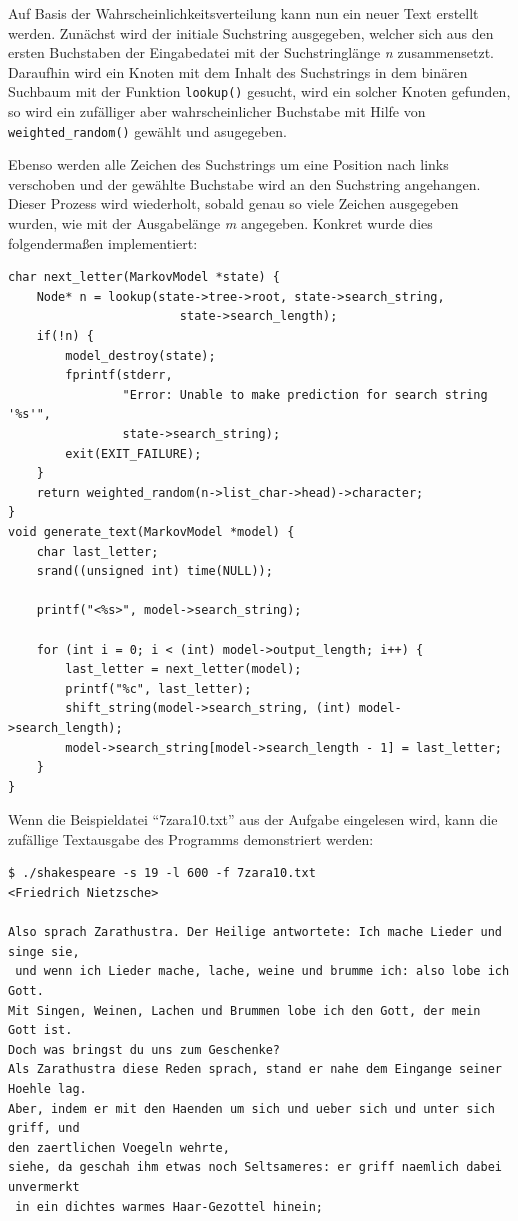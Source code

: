 \documentclass[10pt,a4paper]{article}
\begin{document}
\begin{spacing}{1}
Auf Basis der Wahrscheinlichkeitsverteilung kann nun ein neuer Text erstellt
werden. Zunächst wird der initiale Suchstring ausgegeben, welcher sich aus den
ersten Buchstaben der Eingabedatei mit der Suchstringlänge {\it n\/} zusammensetzt.
Daraufhin wird ein Knoten mit dem Inhalt des Suchstrings in dem binären Suchbaum
mit der Funktion \texttt{lookup()} gesucht,
wird ein solcher Knoten gefunden, so wird ein zufälliger aber wahrscheinlicher Buchstabe
mit Hilfe von \texttt{weighted\_random()} gewählt und asugegeben.

Ebenso werden
alle Zeichen des Suchstrings um eine Position nach links verschoben und
der gewählte Buchstabe wird an den Suchstring angehangen. Dieser Prozess wird
wiederholt, sobald genau so viele Zeichen ausgegeben wurden, wie mit der
Ausgabelänge {\it m\/} angegeben. Konkret wurde dies folgendermaßen implementiert:

\begin{lstlisting}
char next_letter(MarkovModel *state) {
    Node* n = lookup(state->tree->root, state->search_string,
                        state->search_length);
    if(!n) {
        model_destroy(state);
        fprintf(stderr,
                "Error: Unable to make prediction for search string '%s'",
                state->search_string);
        exit(EXIT_FAILURE);
    }
    return weighted_random(n->list_char->head)->character;
}
void generate_text(MarkovModel *model) {
    char last_letter;
    srand((unsigned int) time(NULL));

    printf("<%s>", model->search_string);

    for (int i = 0; i < (int) model->output_length; i++) {
        last_letter = next_letter(model);
        printf("%c", last_letter);
        shift_string(model->search_string, (int) model->search_length);
        model->search_string[model->search_length - 1] = last_letter;
    }
}
\end{lstlisting}

Wenn die Beispieldatei ``7zara10.txt'' aus der Aufgabe eingelesen wird, kann die
zufällige Textausgabe des Programms demonstriert werden:
\begin{lstlisting}
$ ./shakespeare -s 19 -l 600 -f 7zara10.txt
<Friedrich Nietzsche>

Also sprach Zarathustra. Der Heilige antwortete: Ich mache Lieder und singe sie,
 und wenn ich Lieder mache, lache, weine und brumme ich: also lobe ich Gott.
Mit Singen, Weinen, Lachen und Brummen lobe ich den Gott, der mein Gott ist.
Doch was bringst du uns zum Geschenke?
Als Zarathustra diese Reden sprach, stand er nahe dem Eingange seiner Hoehle lag.
Aber, indem er mit den Haenden um sich und ueber sich und unter sich griff, und
den zaertlichen Voegeln wehrte, 
siehe, da geschah ihm etwas noch Seltsameres: er griff naemlich dabei unvermerkt
 in ein dichtes warmes Haar-Gezottel hinein;
\end{lstlisting}


\end{spacing}
\end{document}
